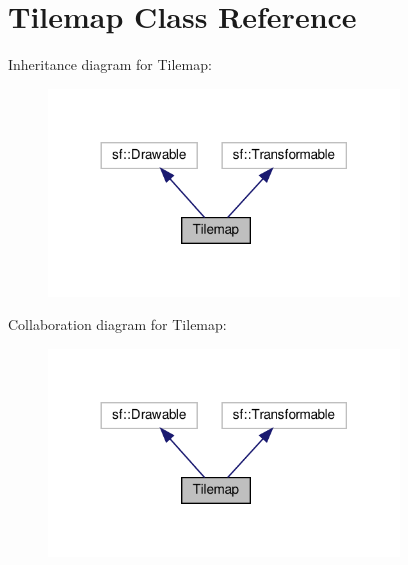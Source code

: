 \hypertarget{class_tilemap}{}\section{Tilemap Class Reference}
\label{class_tilemap}


Inheritance diagram for Tilemap\+:
\nopagebreak
\begin{figure}[H]
\begin{center}
\leavevmode
\includegraphics[width=264pt]{class_tilemap__inherit__graph}
\end{center}
\end{figure}


Collaboration diagram for Tilemap\+:
\nopagebreak
\begin{figure}[H]
\begin{center}
\leavevmode
\includegraphics[width=264pt]{class_tilemap__coll__graph}
\end{center}
\end{figure}

